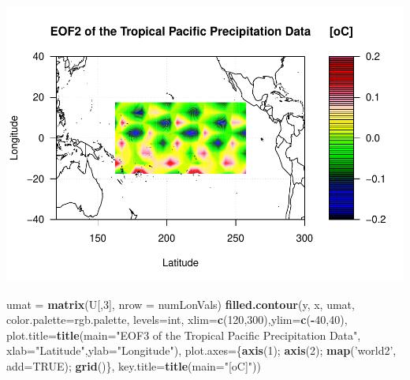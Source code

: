 \documentclass[
]{article}
\newenvironment{Shaded}{\begin{snugshade}}{\end{snugshade}}
\newcommand{\DataTypeTok}[1]{\textcolor[rgb]{0.13,0.29,0.53}{#1}}
\newcommand{\DecValTok}[1]{\textcolor[rgb]{0.00,0.00,0.81}{#1}}
\newcommand{\KeywordTok}[1]{\textcolor[rgb]{0.13,0.29,0.53}{\textbf{#1}}}
\newcommand{\NormalTok}[1]{#1}
\newcommand{\OperatorTok}[1]{\textcolor[rgb]{0.81,0.36,0.00}{\textbf{#1}}}
\newcommand{\OtherTok}[1]{\textcolor[rgb]{0.56,0.35,0.01}{#1}}
\newcommand{\StringTok}[1]{\textcolor[rgb]{0.31,0.60,0.02}{#1}}
\begin{document}
\includegraphics{Assignment3_files/figure-latex/unnamed-chunk-2-2.pdf}

\begin{Shaded}
\begin{Highlighting}[]
\NormalTok{umat =}\StringTok{ }\KeywordTok{matrix}\NormalTok{(U[,}\DecValTok{3}\NormalTok{], }\DataTypeTok{nrow =}\NormalTok{ numLonVals)}
\KeywordTok{filled.contour}\NormalTok{(y, x, umat, }\DataTypeTok{color.palette=}\NormalTok{rgb.palette, }\DataTypeTok{levels=}\NormalTok{int,}
               \DataTypeTok{xlim=}\KeywordTok{c}\NormalTok{(}\DecValTok{120}\NormalTok{,}\DecValTok{300}\NormalTok{),}\DataTypeTok{ylim=}\KeywordTok{c}\NormalTok{(}\OperatorTok{-}\DecValTok{40}\NormalTok{,}\DecValTok{40}\NormalTok{),}
               \DataTypeTok{plot.title=}\KeywordTok{title}\NormalTok{(}\DataTypeTok{main=}\StringTok{"EOF3 of the Tropical Pacific Precipitation Data"}\NormalTok{,}
                                \DataTypeTok{xlab=}\StringTok{"Latitude"}\NormalTok{,}\DataTypeTok{ylab=}\StringTok{"Longitude"}\NormalTok{),}
               \DataTypeTok{plot.axes=}\NormalTok{\{}\KeywordTok{axis}\NormalTok{(}\DecValTok{1}\NormalTok{); }\KeywordTok{axis}\NormalTok{(}\DecValTok{2}\NormalTok{); }\KeywordTok{map}\NormalTok{(}\StringTok{'world2'}\NormalTok{, }\DataTypeTok{add=}\OtherTok{TRUE}\NormalTok{); }\KeywordTok{grid}\NormalTok{()\},}
               \DataTypeTok{key.title=}\KeywordTok{title}\NormalTok{(}\DataTypeTok{main=}\StringTok{"[oC]"}\NormalTok{))}
\end{Highlighting}
\end{Shaded}
\end{document}
